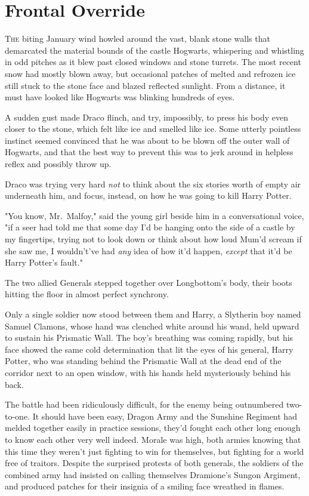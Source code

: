 \chapter{Frontal Override}

\lettrine{T}{he} biting
January wind howled around the vast, blank stone walls that demarcated the
material bounds of the castle Hogwarts, whispering and whistling in odd pitches
as it blew past closed windows and stone turrets. The most recent snow had
mostly blown away, but occasional patches of melted and refrozen ice still
stuck to the stone face and blazed reflected sunlight. From a distance, it must
have looked like Hogwarts was blinking hundreds of eyes.

A sudden gust made Draco flinch, and try, impossibly, to press his body even
closer to the stone, which felt like ice and smelled like ice. Some utterly
pointless instinct seemed convinced that he was about to be blown off the outer
wall of Hogwarts, and that the best way to prevent this was to jerk around in
helpless reflex and possibly throw up.

Draco was trying very hard \emph{not} to think about the six stories worth of
empty air underneath him, and focus, instead, on how he was going to kill Harry
Potter.

"You know, Mr.~Malfoy," said the young girl beside him in a conversational
voice, "if a seer had told me that some day I'd be hanging onto the side of a
castle by my fingertips, trying not to look down or think about how loud Mum'd
scream if she saw me, I wouldn't've had \emph{any} idea of how it'd happen,
\emph{except} that it'd be Harry Potter's fault."

The two allied Generals stepped together over Longbottom's body, their boots
hitting the floor in almost perfect synchrony.

Only a single soldier now stood between them and Harry, a Slytherin boy named
Samuel Clamons, whose hand was clenched white around his wand, held upward to
sustain his Prismatic Wall. The boy's breathing was coming rapidly, but his
face showed the same cold determination that lit the eyes of his general, Harry
Potter, who was standing behind the Prismatic Wall at the dead end of the
corridor next to an open window, with his hands held mysteriously behind his
back.

The battle had been ridiculously difficult, for the enemy being outnumbered
two-to-one. It should have been easy, Dragon Army and the Sunshine Regiment had
melded together easily in practice sessions, they'd fought each other long
enough to know each other very well indeed. Morale was high, both armies
knowing that this time they weren't just fighting to win for themselves, but
fighting for a world free of traitors. Despite the surprised protests of both
generals, the soldiers of the combined army had insisted on calling themselves
Dramione's Sungon Argiment, and produced patches for their insignia of a
smiling face wreathed in flames.

